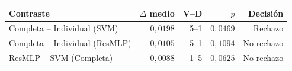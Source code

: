 \begin{resulttable}
\centering\fontsize{8}{10}\selectfont\setlength{\tabcolsep}{3.0pt}
\caption{Contrastes pareados de macro-F1 por clasificador, con un bloque por dataset. Completa--Individual usa Wilcoxon exacto unilateral ($H_1$: Completa $>$ Individual); ResMLP--SVM usa prueba bilateral.}
\label{tab:classifier-contrasts}
\begin{tabular}{@{}lrrrr@{}}
\toprule
Contraste & $\Delta$ medio & V--D & $p$ & Decisión \\
\midrule
Completa -- Individual (SVM) & $0{,}0198$ & 5--1 & $0{,}0469$ & Rechazo \\
Completa -- Individual (ResMLP) & $0{,}0105$ & 5--1 & $0{,}1094$ & No rechazo \\
ResMLP -- SVM (Completa) & $-0{,}0088$ & 1--5 & $0{,}0625$ & No rechazo \\
\bottomrule
\end{tabular}
\end{resulttable}
\FloatBarrier
